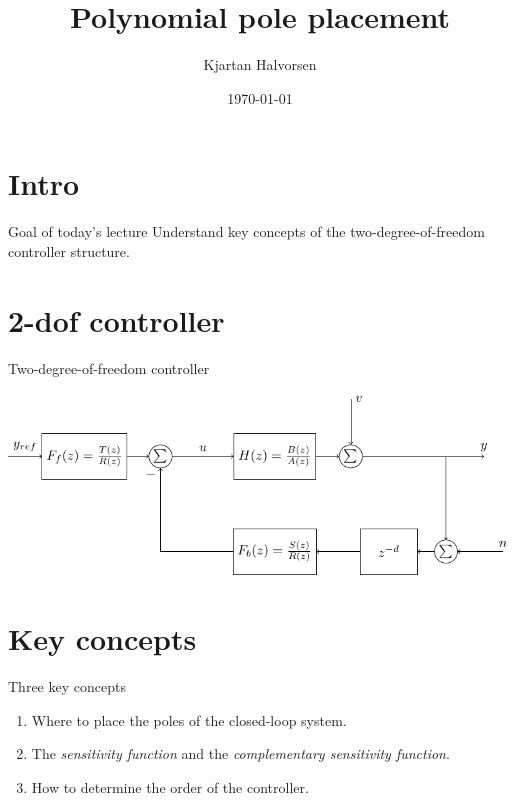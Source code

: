 \documentclass[presentation,aspectratio=169]{beamer}
\author{Kjartan Halvorsen}
\date{\today}
\title{Polynomial pole placement}
\begin{document}
\maketitle


\section{Intro}
\label{sec:org19d6543}

\begin{frame}[label={sec:orgb7ad1e3}]{Goal of today's lecture}
Understand key concepts of the two-degree-of-freedom controller structure.
\end{frame}


\section{2-dof controller}
\label{sec:org97d694c}

\begin{frame}[label={sec:org63c157a}]{Two-degree-of-freedom controller}
\begin{center}
\includegraphics[width=0.8\linewidth]{../../figures/2dof-block-explicit}
\end{center}
\end{frame}

\section{Key concepts}
\label{sec:org724838f}
\begin{frame}[label={sec:orgb8c549e}]{Three key concepts}
\begin{enumerate}
\item Where to place the poles of the closed-loop system.
\item The \emph{sensitivity function} and the \emph{complementary sensitivity function}.
\item How to determine the order of the controller.
\end{enumerate}
\end{frame}
\end{document}
